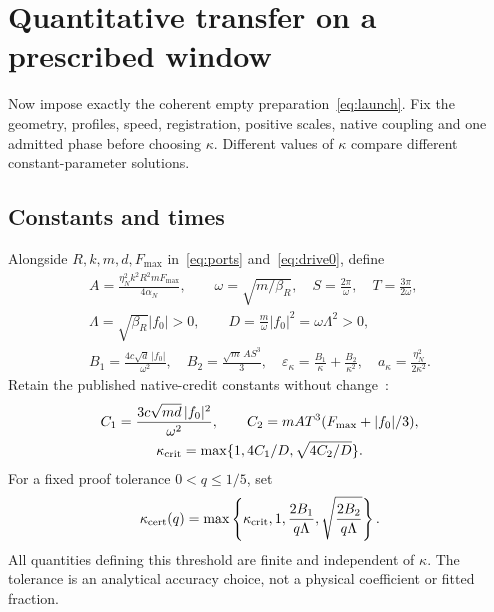 \section{Quantitative transfer on a prescribed window}\label{sec:transfer}
Now impose exactly the coherent empty preparation~\eqref{eq:launch}. Fix the geometry, profiles, speed, registration, positive scales, native coupling and one admitted phase before choosing $\kappa$. Different values of $\kappa$ compare different constant-parameter solutions.

\subsection{Constants and times}
Alongside $R,k,m,d,F_{\max}$ in~\eqref{eq:ports} and~\eqref{eq:drive0}, define
\begin{equation}\label{eq:constants}%
\begin{gathered}
A=\frac{\eta_N^2k^2R^2mF_{\max}}{4\alpha_N},\qquad
\omega=\sqrt{m/\beta_R},\quad S=\frac{2\pi}{\omega},\quad T=\frac{3\pi}{2\omega},\\
\Lambda=\sqrt{\beta_R}|f_0|>0,\qquad
D=\frac m\omega|f_0|^2=\omega\Lambda^2>0,\\
B_1=\frac{4c\sqrt d\,|f_0|}{\omega^2},\quad
B_2=\frac{\sqrt m\,AS^3}{3},\quad
\varepsilon_\kappa=\frac{B_1}{\kappa}+\frac{B_2}{\kappa^2},
\quad a_\kappa=\frac{\eta_N^2}{2\kappa^2}.
\end{gathered}
\end{equation}
Retain the published native-credit constants without change~\cite[Section 3]{p2}:
\begin{equation}\label{eq:nativethreshold}%
\begin{gathered}
C_1=\frac{3c\sqrt{md}\,|f_0|^2}{\omega^2},\qquad
C_2=mAT^3(F_{\max}+|f_0|/3),\\
\kappa_{\rm crit}=\max\{1,4C_1/D,\sqrt{4C_2/D}\}.
\end{gathered}
\end{equation}
For a fixed proof tolerance $0<q\le1/5$, set
\begin{equation}\label{eq:cert}%
\kappa_{\rm cert}(q)=
\max\left\{\kappa_{\rm crit},1,\frac{2B_1}{q\Lambda},
\sqrt{\frac{2B_2}{q\Lambda}}\right\}.
\end{equation}
All quantities defining this threshold are finite and independent of $\kappa$. The tolerance is an analytical accuracy choice, not a physical coefficient or fitted fraction.


